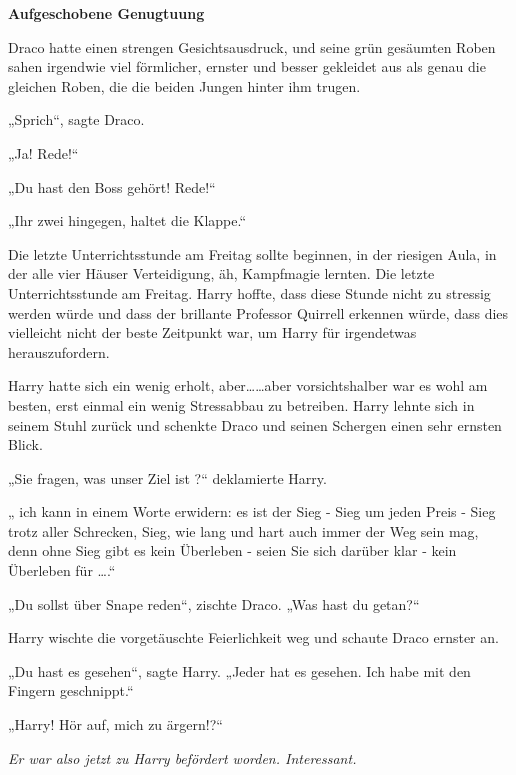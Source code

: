 

\hypertarget{aufgeschobene-genugtuung}{%

\textbf{Aufgeschobene Genugtuung}

Draco hatte einen strengen Gesichtsausdruck, und seine grün gesäumten Roben sahen irgendwie viel förmlicher, ernster und besser gekleidet aus als genau die gleichen Roben, die die beiden Jungen hinter ihm trugen.

„Sprich“, sagte Draco.

„Ja! Rede!“

„Du hast den Boss gehört! Rede!“

„Ihr zwei hingegen, haltet die Klappe.“

Die letzte Unterrichtsstunde am Freitag sollte beginnen, in der riesigen Aula, in der alle vier Häuser Verteidigung, äh, Kampfmagie lernten. Die letzte Unterrichtsstunde am Freitag. Harry hoffte, dass diese Stunde nicht zu stressig werden würde und dass der brillante Professor Quirrell erkennen würde, dass dies vielleicht nicht der beste Zeitpunkt war, um Harry für irgendetwas herauszufordern.

Harry hatte sich ein wenig erholt, aber……aber vorsichtshalber war es wohl am besten, erst einmal ein wenig Stressabbau zu betreiben. Harry lehnte sich in seinem Stuhl zurück und schenkte Draco und seinen Schergen einen sehr ernsten Blick.

„Sie fragen, was unser Ziel ist ?“ deklamierte Harry.

„ ich kann in einem Worte erwidern: es ist der Sieg - Sieg um jeden Preis - Sieg trotz aller Schrecken, Sieg, wie lang und hart auch immer der Weg sein mag, denn ohne Sieg gibt es kein Überleben - seien Sie sich darüber klar - kein Überleben für ….“

„Du sollst über Snape reden“, zischte Draco. „Was hast du getan?“

Harry wischte die vorgetäuschte Feierlichkeit weg und schaute Draco ernster an.

„Du hast es gesehen“, sagte Harry. „Jeder hat es gesehen. Ich habe mit den Fingern geschnippt.“

„Harry! Hör auf, mich zu ärgern!?“

\emph{Er war also jetzt zu Harry befördert worden. Interessant.}

}
